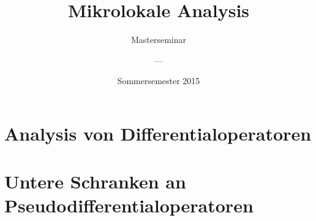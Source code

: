 \documentclass[11pt,bibtotoc]{scrbook}
\theoremstyle{definition}
\begin{document}
\titlehead{Priv.-Doz. Dr. Jens Wirth\\Institut f\"ur Analysis, Dynamik und Modellierung\\Universit\"at Stuttgart}
\lowertitleback{\copyright 2015. Texte geschrieben von den Teilnehmern des Seminars.  Einzelne Beiträge sind nicht namentlich gekennzeichnet. Ausarbeitungen basieren auf Originalliteratur. }
\title{Mikrolokale Analysis}
\subtitle{Masterseminar}
\author{---}
\date{Sommersemester 2015}
\maketitle
\tableofcontents
%
\part{Analysis von Differentialoperatoren}
%
%
%
\part{Untere Schranken an Pseudodifferentialoperatoren}
%

%
%



\printindex
\end{document}
